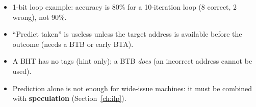 \begin{trap}
\begin{itemize}
\item 1-bit loop example: accuracy is 80\% for a 10-iteration loop (8 correct, 2 wrong), not 90\%.
\item ``Predict taken'' is useless unless the target address is available before the outcome (needs a BTB or early BTA).
\item A BHT has no tags (hint only); a BTB \emph{does} (an incorrect address cannot be used).
\item Prediction alone is not enough for wide-issue machines: it must be combined with \textbf{speculation} (Section~\ref{ch:ilp}).
\end{itemize}
\end{trap}

